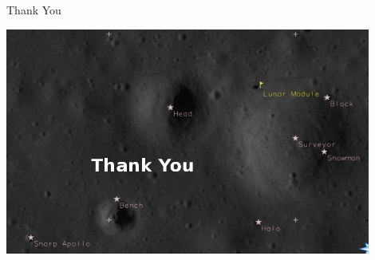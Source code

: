 \documentclass[aspectratio=169,unknownkeysallowed,xcolor=dvipsnames,beamer]{beamer} %
\begin{document}
\begin{frame}[fragile]{Thank You}
\begin{center}
  \includegraphics[width=12cm]{images/fig1_small}
\end{center}
\end{frame}
\end{document}
